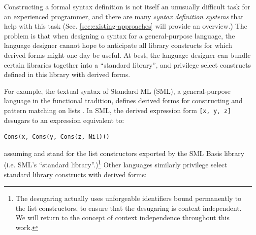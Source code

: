
Constructing a formal syntax definition is not itself an unusually difficult task for an experienced programmer, and there are many \emph{syntax definition systems} that help with this task (Sec. \ref{sec:existing-approaches} will provide an overview.) The problem is that when designing a syntax for a general-purpose language, the language designer cannot hope to anticipate all library constructs for which derived forms might one day be useful. At best, the language designer can bundle certain libraries together into a ``standard library'', and privilege select constructs defined in this library with derived forms. 

For example, the textual syntax of Standard ML (SML), a general-purpose language in the functional tradition, defines derived forms for constructing and pattern matching on lists \cite{mthm97-for-dart,harper1997programming}. In SML, the derived expression form \lstinline{[x, y, z]} desugars to an expression equivalent to:
\begin{lstlisting}[numbers=none]
Cons(x, Cons(y, Cons(z, Nil)))
\end{lstlisting}
assuming  and  stand for the list constructors exported by the SML Basis library (i.e. SML's ``standard library''.)\footnote{The desugaring actually uses unforgeable identifiers bound permanently to the list constructors, to ensure that the desugaring is context independent. We will return to the concept of context independence throughout this work.} Other languages similarly privilege select standard library constructs with derived forms:

